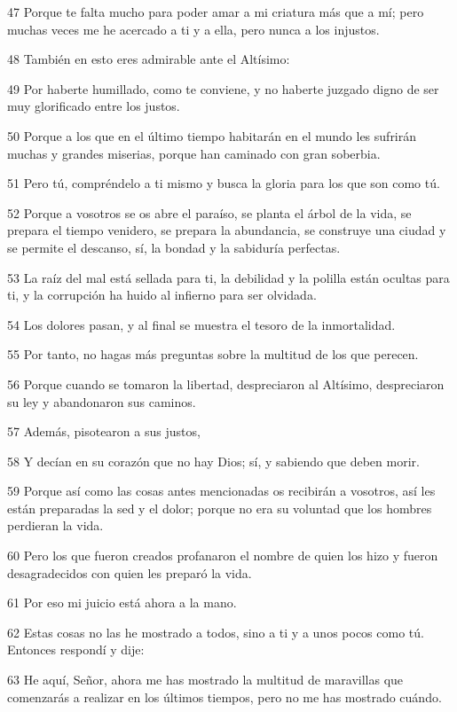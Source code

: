 \par 47 Porque te falta mucho para poder amar a mi criatura más que a mí; pero muchas veces me he acercado a ti y a ella, pero nunca a los injustos.
\par 48 También en esto eres admirable ante el Altísimo:
\par 49 Por haberte humillado, como te conviene, y no haberte juzgado digno de ser muy glorificado entre los justos.
\par 50 Porque a los que en el último tiempo habitarán en el mundo les sufrirán muchas y grandes miserias, porque han caminado con gran soberbia.
\par 51 Pero tú, compréndelo a ti mismo y busca la gloria para los que son como tú.
\par 52 Porque a vosotros se os abre el paraíso, se planta el árbol de la vida, se prepara el tiempo venidero, se prepara la abundancia, se construye una ciudad y se permite el descanso, sí, la bondad y la sabiduría perfectas.
\par 53 La raíz del mal está sellada para ti, la debilidad y la polilla están ocultas para ti, y la corrupción ha huido al infierno para ser olvidada.
\par 54 Los dolores pasan, y al final se muestra el tesoro de la inmortalidad.
\par 55 Por tanto, no hagas más preguntas sobre la multitud de los que perecen.
\par 56 Porque cuando se tomaron la libertad, despreciaron al Altísimo, despreciaron su ley y abandonaron sus caminos.
\par 57 Además, pisotearon a sus justos,
\par 58 Y decían en su corazón que no hay Dios; sí, y sabiendo que deben morir.
\par 59 Porque así como las cosas antes mencionadas os recibirán a vosotros, así les están preparadas la sed y el dolor; porque no era su voluntad que los hombres perdieran la vida.
\par 60 Pero los que fueron creados profanaron el nombre de quien los hizo y fueron desagradecidos con quien les preparó la vida.
\par 61 Por eso mi juicio está ahora a la mano.
\par 62 Estas cosas no las he mostrado a todos, sino a ti y a unos pocos como tú. Entonces respondí y dije:
\par 63 He aquí, Señor, ahora me has mostrado la multitud de maravillas que comenzarás a realizar en los últimos tiempos, pero no me has mostrado cuándo.

